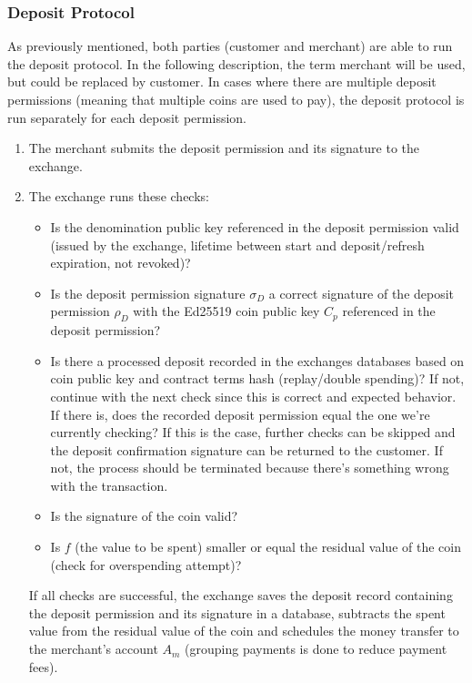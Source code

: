 \subsubsection{Deposit Protocol}
\label{sec:deposit-protocol}
As previously mentioned, both parties (customer and merchant) are able to run the deposit protocol.
In the following description, the term merchant will be used, but could be replaced by customer.
In cases where there are multiple deposit permissions (meaning that multiple coins are used to pay), the deposit protocol is run separately for each deposit permission.
\begin{enumerate}
    \item The merchant submits the deposit permission and its signature to the exchange.
    \item The exchange runs these checks:
          \begin{itemize}
              \item Is the denomination public key referenced in the deposit permission valid (issued by the exchange, lifetime between start and deposit/refresh expiration, not revoked)?
              \item Is the deposit permission signature $ \sigma_{D} $ a correct signature of the deposit permission $ \rho_{D} $ with the Ed25519 coin public key $ C_p $ referenced in the deposit permission?
              \item Is there a processed deposit recorded in the exchanges databases based on coin public key and contract terms hash (replay/double spending)?
                    If not, continue with the next check since this is correct and expected behavior.
                    \\If there is, does the recorded deposit permission equal the one we're currently checking?
                    If this is the case, further checks can be skipped and the deposit confirmation signature can be returned to the customer.
                    If not, the process should be terminated because there's something wrong with the transaction.
              \item Is the signature of the coin valid?
              \item Is $ f $ (the value to be spent) smaller or equal the residual value of the coin (check for overspending attempt)?
          \end{itemize}
          If all checks are successful, the exchange saves the deposit record containing the deposit permission and its signature in a database, subtracts the spent value from the residual value of the coin and schedules the money transfer to the merchant's account $ A_m $ (grouping payments is done to reduce payment fees).

\end{enumerate}

